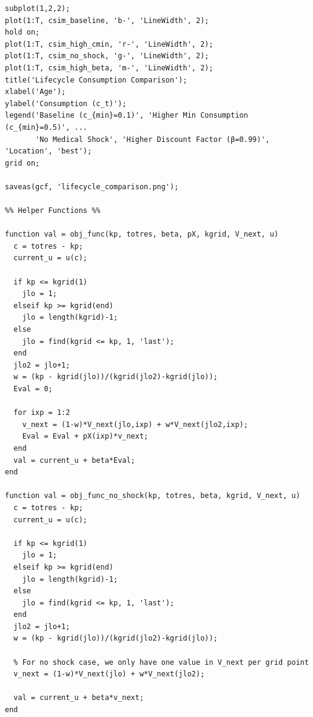 \documentclass[10pt,a4paper]{article}
\begin{document}
\begin{lstlisting}
subplot(1,2,2);
plot(1:T, csim_baseline, 'b-', 'LineWidth', 2);
hold on;
plot(1:T, csim_high_cmin, 'r-', 'LineWidth', 2);
plot(1:T, csim_no_shock, 'g-', 'LineWidth', 2);
plot(1:T, csim_high_beta, 'm-', 'LineWidth', 2);
title('Lifecycle Consumption Comparison');
xlabel('Age');
ylabel('Consumption (c_t)');
legend('Baseline (c_{min}=0.1)', 'Higher Min Consumption (c_{min}=0.5)', ...
       'No Medical Shock', 'Higher Discount Factor (β=0.99)', 'Location', 'best');
grid on;

saveas(gcf, 'lifecycle_comparison.png');

%% Helper Functions %%

function val = obj_func(kp, totres, beta, pX, kgrid, V_next, u)
  c = totres - kp;
  current_u = u(c);

  if kp <= kgrid(1)
    jlo = 1;
  elseif kp >= kgrid(end)
    jlo = length(kgrid)-1;
  else
    jlo = find(kgrid <= kp, 1, 'last');
  end
  jlo2 = jlo+1; 
  w = (kp - kgrid(jlo))/(kgrid(jlo2)-kgrid(jlo));
  Eval = 0;

  for ixp = 1:2
    v_next = (1-w)*V_next(jlo,ixp) + w*V_next(jlo2,ixp);     
    Eval = Eval + pX(ixp)*v_next;
  end
  val = current_u + beta*Eval;
end

function val = obj_func_no_shock(kp, totres, beta, kgrid, V_next, u)
  c = totres - kp;
  current_u = u(c);

  if kp <= kgrid(1)
    jlo = 1;
  elseif kp >= kgrid(end)
    jlo = length(kgrid)-1;
  else
    jlo = find(kgrid <= kp, 1, 'last');
  end
  jlo2 = jlo+1; 
  w = (kp - kgrid(jlo))/(kgrid(jlo2)-kgrid(jlo));
  
  % For no shock case, we only have one value in V_next per grid point
  v_next = (1-w)*V_next(jlo) + w*V_next(jlo2);
  
  val = current_u + beta*v_next;
end
\end{lstlisting}
\end{document}
